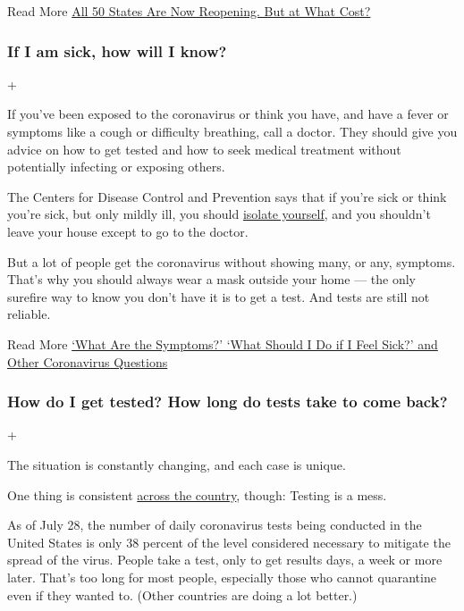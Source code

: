  Read More
\href{https://www.nytimes3xbfgragh.onion/2020/05/20/us/coronavirus-reopening-50-states.html}{All
50 States Are Now Reopening. But at What Cost?}

\hypertarget{if-i-am-sick-how-will-i-know}{%
\subsubsection{If I am sick, how will I
know?}\label{if-i-am-sick-how-will-i-know}}

+

If you've been exposed to the coronavirus or think you have, and have a
fever or symptoms like a cough or difficulty breathing, call a doctor.
They should give you advice on how to get tested and how to seek medical
treatment without potentially infecting or exposing others.

The Centers for Disease Control and Prevention says that if you're sick
or think you're sick, but only mildly ill, you should
\href{https://www.cdc.gov/coronavirus/2019-ncov/about/steps-when-sick.html}{isolate
yourself}, and you shouldn't leave your house except to go to the
doctor.

But a lot of people get the coronavirus without showing many, or any,
symptoms. That's why you should always wear a mask outside your home ---
the only surefire way to know you don't have it is to get a test. And
tests are still not reliable.

 Read More
\href{https://www.nytimes3xbfgragh.onion/article/symptoms-coronavirus.html}{`What
Are the Symptoms?' `What Should I Do if I Feel Sick?' and Other
Coronavirus Questions}

\hypertarget{how-do-i-get-tested-how-long-do-tests-take-to-come-back}{%
\subsubsection{How do I get tested? How long do tests take to come
back?}\label{how-do-i-get-tested-how-long-do-tests-take-to-come-back}}

+

The situation is constantly changing, and each case is unique.

One thing is consistent
\href{https://www.nytimes3xbfgragh.onion/interactive/2020/us/coronavirus-testing.html}{across
the country}, though: Testing is a mess.

As of July 28, the number of daily coronavirus tests being conducted in
the United States is only 38 percent of the level considered necessary
to mitigate the spread of the virus. People take a test, only to get
results days, a week or more later. That's too long for most people,
especially those who cannot quarantine even if they wanted to. (Other
countries are doing a lot better.)

